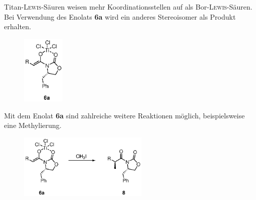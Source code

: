 \documentclass[../kl11.tex]{subfiles}
\begin{document}
Titan-\textsc{Lewis}-Säuren weisen mehr Koordinationsstellen auf als Bor-\textsc{Lewis}-Säuren. Bei Verwendung des Enolats \textbf{6a} wird ein anderes Stereoisomer als Produkt erhalten. 
\begin{figure}[H]
    \centering
    \includegraphics[width=0.18\textwidth]{2024/Abbildungen/Auxiliarchemie/5.eps}
\end{figure}
Mit dem Enolat \textbf{6a} sind zahlreiche weitere Reaktionen möglich, beispielsweise eine Methylierung. 
\begin{figure}[H]
    \centering
    \includegraphics[width=0.55\textwidth]{2024/Abbildungen/Auxiliarchemie/6.eps}
\end{figure}
\end{document}
